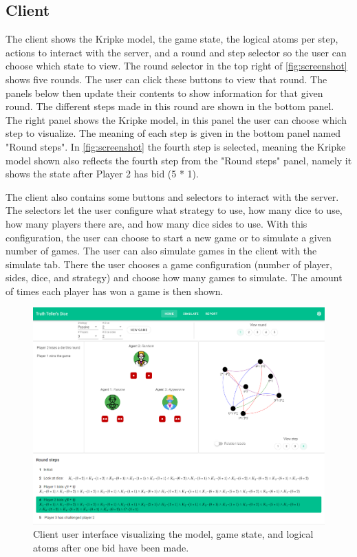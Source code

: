 \documentclass{article}
\begin{document}
\subsection*{Client}
The client shows the Kripke model, the game state, the logical atoms per step, actions to interact with the server, and a round and step selector so the user can choose which state to view. The round selector in the top right of \autoref{fig:screenshot} shows five rounds. The user can click these buttons to view that round. The panels below then update their contents to show information for that given round. The different steps made in this round are shown in the bottom panel. The right panel shows the Kripke model, in this panel the user can choose which step to visualize. The meaning of each step is given in the bottom panel named "Round steps". In \autoref{fig:screenshot} the fourth step is selected, meaning the Kripke model shown also reflects the fourth step from the "Round steps" panel, namely it shows the state after Player 2 has bid (5 * 1).

The client also contains some buttons and selectors to interact with the server. The selectors let the user configure what strategy to use, how many dice to use, how many players there are, and how many dice sides to use. With this configuration, the user can choose to start a new game or to simulate a given number of games. The user can also simulate games in the client with the simulate tab. There the user chooses a game configuration (number of player, sides, dice, and strategy) and choose how many games to simulate. The amount of times each player has won a game is then shown.

\begin{figure}[h]
    \includegraphics[width=\textwidth]{img/imgscreenshot.png}
    \centering
    \caption{Client user interface visualizing the model, game state, and logical atoms after one bid have been made.}
    \label{fig:screenshot}
\end{figure}
\end{document}
